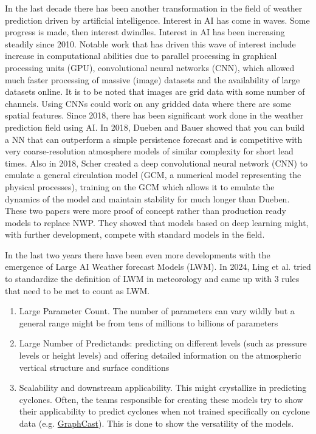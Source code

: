 In the last decade there has been another transformation in the field of weather prediction driven by artificial intelligence. Interest in AI has come in waves. Some progress is made, then interest dwindles. Interest in AI has been increasing steadily since 2010. Notable work that has driven this wave of interest include increase in computational abilities due to parallel processing in graphical processing units (GPU), convolutional neural networks (CNN), which allowed much faster processing of massive (image) datasets and the availability of large datasets online. It is to be noted that images are grid data with some number of channels. Using CNNs could work on any gridded data where there are some spatial features\cite{canNNBeatNWP}. Since 2018, there has been significant work done in the weather prediction field using AI. In 2018, Dueben and Bauer showed that you can build a NN that can outperform a simple persistence forecast and is competitive with very coarse-resolution atmosphere models of similar complexity for short lead times\cite{dueben2018}. Also in 2018, Scher created a deep convolutional neural network (CNN) to emulate a general circulation model (GCM, a numerical model representing the physical processes), training on the GCM which allows it to emulate the dynamics of the model and maintain stability for much longer than Dueben\cite{scher2018}. These two papers were more proof of concept rather than production ready models to replace NWP. They showed that models based on deep learning might, with further development, compete with standard models in the field.

In the last two years there have been even more developments with the emergence of Large AI Weather forecast Models (LWM). In 2024, Ling et al.\cite{SecondRevolution} tried to standardize the definition of LWM in meteorology and came up with 3 rules that need to be met to count as LWM.

\begin{enumerate}[label = Rule \arabic*:]
    \item Large Parameter Count. The number of parameters can vary wildly but a general range might be from tens of millions to billions of parameters
    \item Large Number of Predictands: predicting on different levels (such as pressure levels or height levels) and offering detailed information on the atmospheric vertical structure and surface conditions
    \item Scalability and downstream applicability. This might crystallize in predicting cyclones. Often, the teams responsible for creating these models try to show their applicability to predict cyclones when not trained specifically on cyclone data (e.g. \href{https://www.youtube.com/watch?v=PD1v5PCJs_o&ab_channel=GregBronevetsky}{GraphCast})\cite{SecondRevolution}. This is done to show the versatility of the models.
\end{enumerate}

